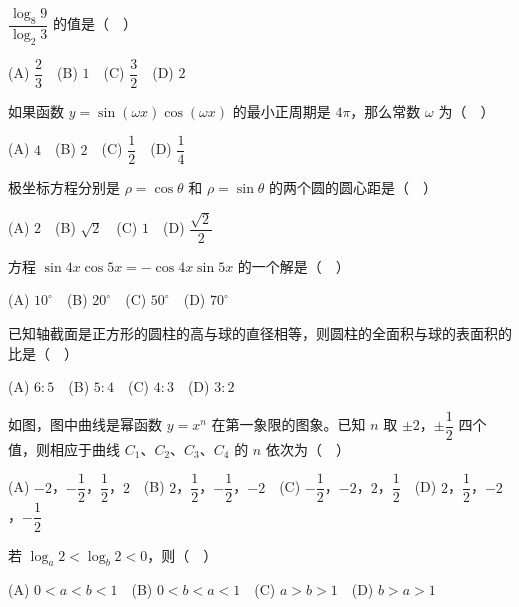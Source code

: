 \begin{question}
\(\dfrac{\log_8 9}{\log_2 3}\) 的值是（　）

(A) \(\dfrac{2}{3}\)　(B) \(1\)　(C) \(\dfrac{3}{2}\)　(D) \(2\)

\end{question}
\begin{question}
如果函数 \(y=\sin(\omega x)\cos(\omega x)\) 的最小正周期是 \(4\pi\)，那么常数 \(\omega\) 为（　）

(A) \(4\)　(B) \(2\)　(C) \(\dfrac{1}{2}\)　(D) \(\dfrac{1}{4}\)

\end{question}
\begin{question}
极坐标方程分别是 \(\rho=\cos\theta\) 和 \(\rho=\sin\theta\) 的两个圆的圆心距是（　）

(A) \(2\)　(B) \(\sqrt{2}\)　(C) \(1\)　(D) \(\dfrac{\sqrt{2}}{2}\)

\end{question}
\begin{question}
方程 \(\sin 4x\cos 5x=-\cos 4x\sin 5x\) 的一个解是（　）

(A) \(10^{\circ}\)　(B) \(20^{\circ}\)　(C) \(50^{\circ}\)　(D) \(70^{\circ}\)

\end{question}
\begin{question}
已知轴截面是正方形的圆柱的高与球的直径相等，则圆柱的全面积与球的表面积的比是（　）

(A) \(6:5\)　(B) \(5:4\)　(C) \(4:3\)　(D) \(3:2\)

\Needspace{0.4\textheight}
\end{question}
\begin{question}
如图，图中曲线是幂函数 \(y=x^{n}\) 在第一象限的图象。已知 \(n\) 取 \(\pm 2\)，\(\pm\dfrac{1}{2}\) 四个值，则相应于曲线 \(C_1\)、\(C_2\)、\(C_3\)、\(C_4\) 的 \(n\) 依次为（　）
\nopagebreak[4]
\begin{center}\end{center}
\nopagebreak[4]
(A) \(-2\)，\(-\dfrac{1}{2}\)，\(\dfrac{1}{2}\)，\(2\)　(B) \(2\)，\(\dfrac{1}{2}\)，\(-\dfrac{1}{2}\)，\(-2\)　(C) \(-\dfrac{1}{2}\)，\(-2\)，\(2\)，\(\dfrac{1}{2}\)　(D) \(2\)，\(\dfrac{1}{2}\)，\(-2\)，\(-\dfrac{1}{2}\)

\end{question}
\begin{question}
若 \(\log_a 2<\log_b 2<0\)，则（　）

(A) \(0<a<b<1\)　(B) \(0<b<a<1\)　(C) \(a>b>1\)　(D) \(b>a>1\)

\end{question}
